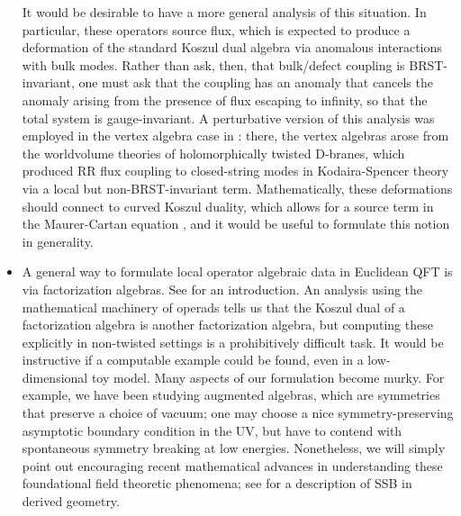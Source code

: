 \documentclass[11pt]{amsart}
\begin{document}
\begin{itemize}
It would be desirable to have a more general analysis of this situation. In particular, these operators source flux, which is expected to produce a deformation of the standard Koszul dual algebra via anomalous interactions with bulk modes. Rather than ask, then, that bulk/defect coupling is BRST-invariant, one must ask that the coupling has an anomaly that cancels the anomaly arising from the presence of flux escaping to infinity, so that the total system is gauge-invariant. A perturbative version of this analysis was employed in the vertex algebra case in \cite{CP}: there, the vertex algebras arose from the worldvolume theories of holomorphically twisted D-branes, which produced RR flux coupling to closed-string modes in Kodaira-Spencer theory via a local but non-BRST-invariant term. Mathematically, these deformations should connect to curved Koszul duality, which allows for a source term in the Maurer-Cartan equation \cite{curved}, and it would be useful to formulate this notion in generality. 

\item A general way to formulate local operator algebraic data in Euclidean QFT is via factorization algebras. See \cite{CG1, CG2} for an introduction. An analysis using the mathematical machinery of operads tells us that the Koszul dual of a factorization algebra is another factorization algebra, but computing these explicitly in non-twisted settings is a prohibitively difficult task. It would be instructive if a computable example could be found, even in a low-dimensional toy model. Many aspects of our formulation become murky. For example, we have been studying augmented algebras, which are symmetries that preserve a choice of vacuum; one may choose a nice symmetry-preserving asymptotic boundary condition in the UV, but have to contend with spontaneous symmetry breaking at low energies. Nonetheless, we will simply point out encouraging recent mathematical advances in understanding these foundational field theoretic phenomena; see \cite{EG} for a description of SSB in derived geometry. 

\end{itemize} 
\end{document}
